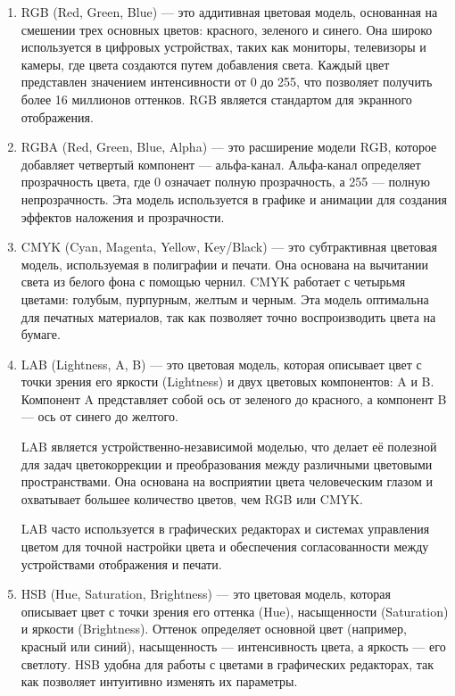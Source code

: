 \begin{enumerate}
    \item RGB (Red, Green, Blue) --- это аддитивная цветовая модель, основанная на смешении трех основных цветов: красного, зеленого и синего. Она широко используется в цифровых устройствах, таких как мониторы, телевизоры и камеры, где цвета создаются путем добавления света. Каждый цвет представлен значением интенсивности от 0 до 255, что позволяет получить более 16 миллионов оттенков. RGB является стандартом для экранного отображения.
    \item RGBA (Red, Green, Blue, Alpha) --- это расширение модели RGB, которое добавляет четвертый компонент --- альфа-канал. Альфа-канал определяет прозрачность цвета, где 0 означает полную прозрачность, а 255 --- полную непрозрачность. Эта модель используется в графике и анимации для создания эффектов наложения и прозрачности.
    \item CMYK (Cyan, Magenta, Yellow, Key/Black) --- это субтрактивная цветовая модель, используемая в полиграфии и печати. Она основана на вычитании света из белого фона с помощью чернил. CMYK работает с четырьмя цветами: голубым, пурпурным, желтым и черным. Эта модель оптимальна для печатных материалов, так как позволяет точно воспроизводить цвета на бумаге.
    \item LAB (Lightness, A, B) --- это цветовая модель, которая описывает цвет с точки зрения его яркости (Lightness) и двух цветовых компонентов: A и B. Компонент A представляет собой ось от зеленого до красного, а компонент B — ось от синего до желтого. 
    
    LAB является устройственно-независимой моделью, что делает её полезной для задач цветокоррекции и преобразования между различными цветовыми пространствами. Она основана на восприятии цвета человеческим глазом и охватывает большее количество цветов, чем RGB или CMYK. 
    
    LAB часто используется в графических редакторах и системах управления цветом для точной настройки цвета и обеспечения согласованности между устройствами отображения и печати.
    \item HSB (Hue, Saturation, Brightness) --- это цветовая модель, которая описывает цвет с точки зрения его оттенка (Hue), насыщенности (Saturation) и яркости (Brightness). Оттенок определяет основной цвет (например, красный или синий), насыщенность — интенсивность цвета, а яркость --- его светлоту. HSB удобна для работы с цветами в графических редакторах, так как позволяет интуитивно изменять их параметры.
\end{enumerate}

